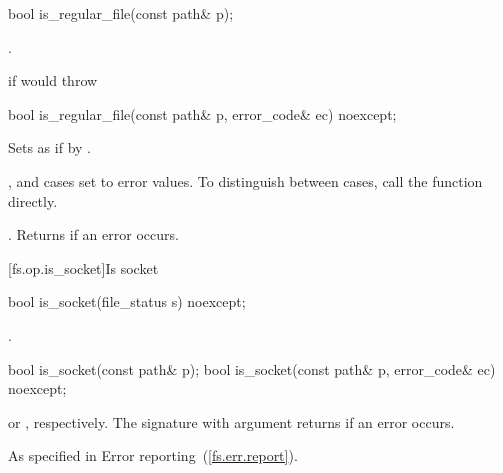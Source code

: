 \begin{itemdecl}
bool is_regular_file(const path& p);
\end{itemdecl}

\begin{itemdescr}
\pnum
\returns {}.

\pnum
\throws {} if  would throw 
\end{itemdescr}

\begin{itemdecl}
bool is_regular_file(const path& p, error_code& ec) noexcept;
\end{itemdecl}

\begin{itemdescr}
\pnum
\effects Sets  as if by . \begin{note}
,  and
   cases set  to error values. To distinguish between cases, call the  function directly. \end{note}

\pnum
\returns {}.
Returns  if an error occurs.
\end{itemdescr}


[fs.op.is_socket]{Is socket}

\begin{itemdecl}
bool is_socket(file_status s) noexcept;
\end{itemdecl}

\begin{itemdescr}
\pnum
\returns {}.
\end{itemdescr}

\begin{itemdecl}
bool is_socket(const path& p);
bool is_socket(const path& p, error_code& ec) noexcept;
\end{itemdecl}

\begin{itemdescr}
\pnum
\returns {} or
  , respectively. The signature with argument
   returns  if an error occurs.

\pnum
\throws As specified in Error reporting~(\ref{fs.err.report}).
\end{itemdescr}



